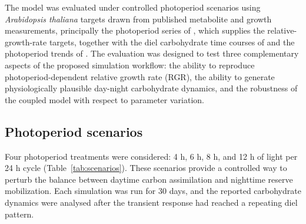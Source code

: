 \documentclass[a4paper,fleqn]{cas-sc}
\begin{document}
The model was evaluated under controlled photoperiod scenarios using
\textit{Arabidopsis thaliana} targets drawn from published metabolite and
growth measurements, principally the photoperiod series of
\citet{Sulpice2014}, which supplies the relative-growth-rate targets, together
with the diel carbohydrate time courses of \citet{Annunziata2017} and the
photoperiod trends of \citet{Mengin2017}. The evaluation was
designed to test three complementary aspects of the proposed simulation
workflow: the ability to reproduce photoperiod-dependent relative growth rate
(RGR), the ability to generate physiologically plausible day-night
carbohydrate dynamics, and the robustness of the coupled model with respect to
parameter variation.

\subsection{Photoperiod scenarios}

Four photoperiod treatments were considered: 4 h, 6 h, 8 h, and 12 h of light
per 24 h cycle (Table~\ref{tab:scenarios}). These scenarios provide a
controlled way to perturb the balance
between daytime carbon assimilation and nighttime reserve mobilization. Each
simulation was run for 30 days, and the reported carbohydrate dynamics were
analysed after the transient response had reached a repeating diel pattern.
\end{document}
